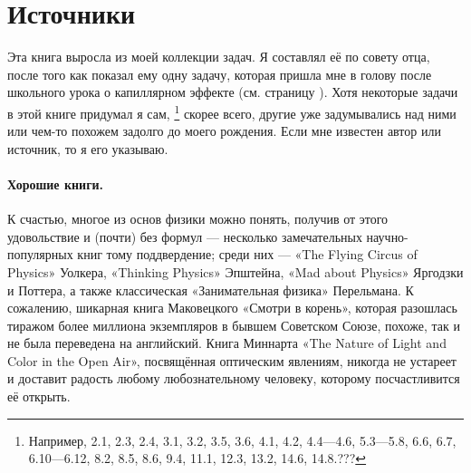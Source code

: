 \section{Источники}

Эта книга выросла из моей коллекции задач.
Я составлял её по совету отца, после того как показал ему одну задачу, которая пришла мне в голову после школьного урока о капиллярном эффекте (см. страницу \pageref{???}).
Хотя некоторые задачи в этой книге придумал я сам,%
\footnote{Например, 2.1, 2.3, 2.4, 3.1, 3.2, 3.5, 3.6, 4.1, 4.2, 4.4---4.6, 5.3---5.8, 6.6, 6.7,
6.10---6.12, 8.2, 8.5, 8.6, 9.4, 11.1, 12.3, 13.2, 14.6, 14.8.???}
скорее всего, другие уже задумывались над ними или чем-то похожем задолго до моего рождения.
Если мне известен автор или источник, то я его указываю.

\paragraph{Хорошие книги.}
К счастью, многое из основ физики можно понять, получив от этого удовольствие и (почти) без формул ---
несколько замечательных научно-популярных книг тому поддвердение;
среди них — «The Flying Circus of Physics» Уолкера,
«Thinking Physics» Эпштейна,
«Mad about Physics» Яргодзки и Поттера,
а также классическая «Занимательная физика» Перельмана.
К сожалению, шикарная книга Маковецкого «Смотри в корень», которая разошлась тиражом более миллиона экземпляров в бывшем Советском Союзе, похоже, так и не была переведена на английский.
Книга Миннарта «The Nature of Light and Color in the Open Air», посвящённая оптическим явлениям, никогда не устареет и доставит радость любому любознательному человеку, которому посчастливится её открыть.
